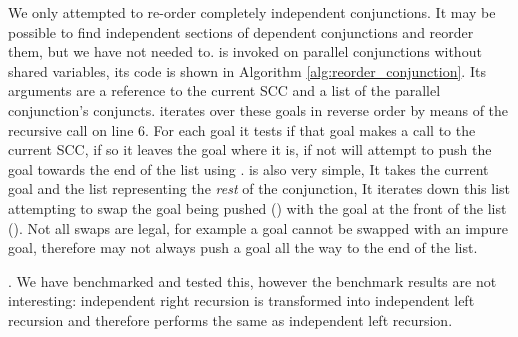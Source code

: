 We only attempted to re-order completely independent conjunctions.
It may be possible to find independent sections of dependent conjunctions
and reorder them,
but we have not needed to.
\reorder is invoked on parallel conjunctions without shared variables,
its code is shown in Algorithm \ref{alg:reorder_conjunction}.
Its arguments are a reference to the current SCC and a list of the parallel
conjunction's conjuncts.
\reorder iterates over these goals in reverse order by means of the
recursive call on line 6.
For each goal it tests if that goal makes a call to the current SCC,
if so it leaves the goal where it is,
if not \reorder will attempt to push the goal towards the end of the
list using \trypushconjlater.
\trypushconjlater is also very simple,
It takes the current goal and the list representing the \emph{rest} of the
conjunction,
It iterates down this list attempting to swap the goal being pushed
() with the goal at the front of the list ().
Not all swaps are legal,
for example a goal cannot be swapped with an impure goal,
therefore \trypushconjlater may not always push a goal all the way to the
end of the list.

.
We have benchmarked and tested this,
however the benchmark results are not interesting:
independent right recursion is transformed into independent left
recursion and therefore performs the same as independent left recursion.


